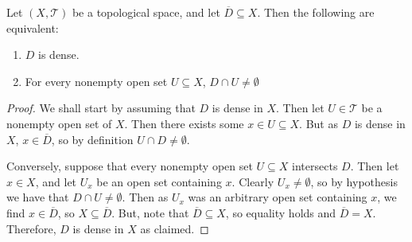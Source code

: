 \documentclass[12pt, a4paper, oneside, openright, titlepage]{book}
\begin{document}
\begin{prop}
    Let $(X,\mathcal{T})$ be a topological space, and let $\overline{D} \subseteq X$. Then the following are equivalent: \begin{enumerate}
        \item $D$ is dense.
        \item For every nonempty open set $U \subseteq X$, $D\cap U \neq \emptyset$
    \end{enumerate}
\end{prop}
\begin{proof}
    We shall start by assuming that $D$ is dense in $X$. Then let $U \in \mathcal{T}$ be a nonempty open set of $X$. Then there exists some $x \in U \subseteq X$. But as $D$ is dense in $X$, $x \in \overline{D}$, so by definition $U \cap D \neq \emptyset$.


    Conversely, suppose that every nonempty open set $U\subseteq X$ intersects $D$. Then let $x \in X$, and let $U_x$ be an open set containing $x$. Clearly $U_x \neq \emptyset$, so by hypothesis we have that $D\cap U \neq \emptyset$. Then as $U_x$ was an arbitrary open set containing $x$, we find $x \in \overline{D}$, so $X\subseteq \overline{D}$. But, note that $\overline{D} \subseteq X$, so equality holds and $\overline{D} = X$. Therefore, $D$ is dense in $X$ as claimed.
\end{proof}
\end{document}
